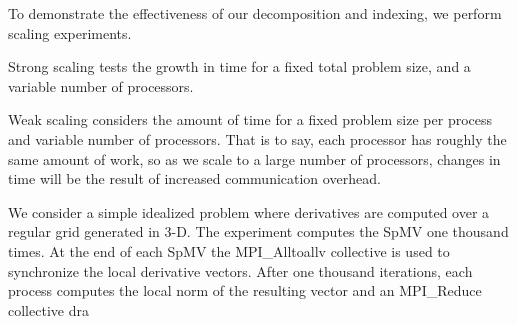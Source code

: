 \documentclass{report}
\begin{document}
To demonstrate the effectiveness of our decomposition and indexing, we perform scaling experiments. 

Strong scaling tests the growth in time for a fixed total problem size, and a variable number of processors. 

Weak scaling considers the amount of time for a fixed problem size per process and variable number of processors. That is to say, each processor has roughly the same amount of work, so as we scale to a large number of processors, changes in time will be the result of increased communication overhead. 

We consider a simple idealized problem where derivatives are computed over a regular grid generated in 3-D. The experiment computes the SpMV one thousand times. At the end of each SpMV the MPI\_Alltoallv collective is used to synchronize the local derivative vectors. After one thousand iterations, each process computes the local norm of the resulting vector and an MPI\_Reduce collective dra
\end{document}
